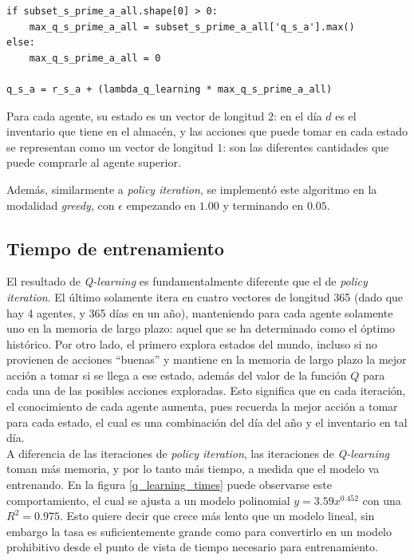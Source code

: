 \begin{enumerate}
\begin{verbatim}
if subset_s_prime_a_all.shape[0] > 0:
    max_q_s_prime_a_all = subset_s_prime_a_all['q_s_a'].max()
else:
    max_q_s_prime_a_all = 0

q_s_a = r_s_a + (lambda_q_learning * max_q_s_prime_a_all)
\end{verbatim}

Para cada agente, su estado es un vector de longitud $2$: en el d\'ia $d$ es el inventario que tiene en el almac\'en, y las acciones que puede tomar en cada estado se representan como un vector de longitud $1$: son las diferentes cantidades que puede comprarle al agente superior.
\end{enumerate}

Adem\'as, similarmente a \textit{policy iteration}, se implement\'o este algoritmo en la modalidad \textit{greedy}, con $\epsilon$ empezando en $1.00$ y terminando en $0.05$.

\subsection{Tiempo de entrenamiento}

El resultado de \textit{Q-learning} es fundamentalmente diferente que el de \textit{policy iteration}. El \'ultimo solamente itera en cuatro vectores de longitud 365 (dado que hay 4 agentes, y 365 d\'ias en un a\~no), manteniendo para cada agente solamente uno en la memoria de largo plazo: aquel que se ha determinado como el \'optimo hist\'orico. Por otro lado, el primero explora estados del mundo, incluso si no provienen de acciones ``buenas'' y mantiene en la memoria de largo plazo la mejor acci\'on a tomar si se llega a ese estado, adem\'as del valor de la funci\'on $Q$ para cada una de las posibles acciones exploradas. Esto significa que en cada iteraci\'on, el conocimiento de cada agente aumenta, pues recuerda la mejor acci\'on a tomar para cada estado, el cual es una combinaci\'on del d\'ia del a\~no y el inventario en tal d\'ia.\\

A diferencia de las iteraciones de \textit{policy iteration}, las iteraciones de \textit{Q-learning} toman m\'as memoria, y por lo tanto m\'as tiempo, a medida que el modelo va entrenando. En la figura \ref{q_learning_times} puede observarse este comportamiento, el cual se ajusta a un modelo polinomial $y=3.59x^{0.452}$ con una $R^2=0.975$. Esto quiere decir que crece m\'as lento que un modelo lineal, sin embargo la tasa es suficientemente grande como para convertirlo en un modelo prohibitivo desde el punto de vista de tiempo necesario para entrenamiento.

